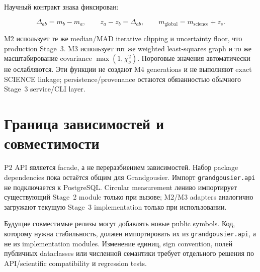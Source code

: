Научный контракт знака фиксирован:

\[
\Delta_{ab}=m_b-m_a,\qquad z_a-z_b=\Delta_{ab},\qquad
m_{\mathrm{global}}=m_{\mathrm{science}}+z_s.
\]

M2 использует те же median/MAD iterative clipping и uncertainty floor, что production Stage~3. M3 использует тот же weighted least-squares graph и то же масштабирование covariance \(\max(1,\chi^2_\nu)\). Пороговые значения автоматически не ослабляются. Эти функции не создают M4 generations и не выполняют exact SCIENCE linkage; persistence/provenance остаются обязанностью обычного Stage~3 service/CLI layer.

\section{Граница зависимостей и совместимости}

P2 API является facade, а не переразбиением зависимостей. Набор package dependencies пока остаётся общим для Grandgousier. Импорт \texttt{grandgousier.api} не подключается к PostgreSQL. Circular measurement лениво импортирует существующий Stage~2 module только при вызове; M2/M3 adapters аналогично загружают текущую Stage~3 implementation только при использовании.

Будущие совместимые релизы могут добавлять новые public symbols. Код, которому нужна стабильность, должен импортировать их из \texttt{grandgousier.api}, а не из implementation modules. Изменение единиц, sign convention, полей публичных dataclasses или численной семантики требует отдельного решения по API/scientific compatibility и regression tests.
